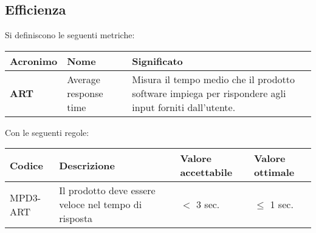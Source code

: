 \subsection{Efficienza}
Si definiscono le seguenti metriche:
\begin{table}[h!]
\centering
\def\arraystretch{1.5}
\begin{tabular}{ |m{2cm}|m{5.5cm}|m{6.5cm}| }
\hline
\rowcolor{lightgray!30}
\textbf{Acronimo} & \textbf{Nome} & \textbf{Significato}\\
\hline
\textbf{ART} & Average response time & Misura il tempo medio che il prodotto software impiega per rispondere agli input forniti dall'utente.\\
\hline
\end{tabular}
\end{table}
\par Con le seguenti regole:
\begin{table}[h!]
\centering
\def\arraystretch{1.5}
\begin{tabular}{ |>{\centering\arraybackslash}m{2.5cm}|>{\centering\arraybackslash}m{5.5cm}|>{\centering\arraybackslash}m{3cm}|>{\centering\arraybackslash}m{3cm}| }
\hline
\rowcolor{black}
\textbf{\color{white} Codice} & \textbf{\color{white} Descrizione} & \textbf{\color{white} Valore accettabile} & \textbf{\color{white} Valore ottimale}\\
\hline
MPD3-ART & Il prodotto deve essere veloce nel tempo di risposta & $<$ 3 sec. & $\leq$ 1 sec. \\
\hline
\end{tabular}
\end{table}

